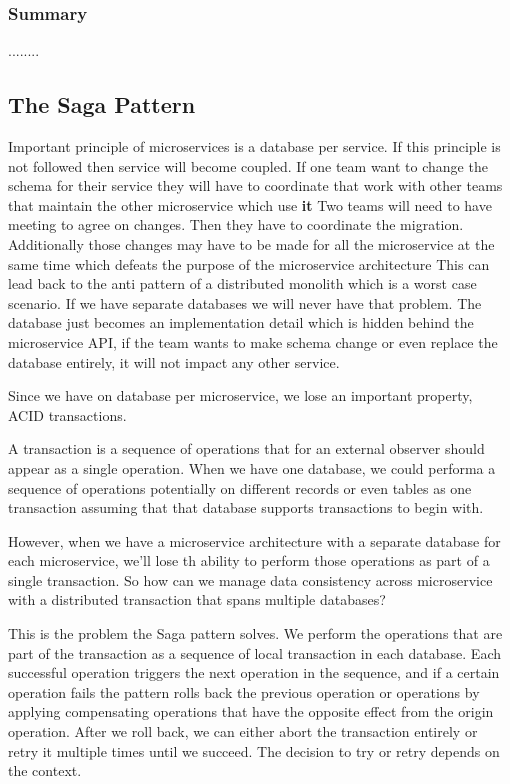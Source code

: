 \subsubsection{Summary}
........

\subsection{The Saga Pattern}
Important principle of microservices is a database per service.
If this principle is not followed then service will become coupled.
If one team want to change the schema for their service they will have to coordinate that work with other teams that maintain the other microservice which use \textbf{it}
Two teams will need to have meeting to agree on changes.
Then they have to coordinate the migration.
Additionally those changes may have to be made for all the microservice at the same time which defeats the purpose of the microservice architecture
This can lead back to the anti pattern of a distributed monolith which is a worst case scenario.
If we have separate databases we will never have that problem.
The database just becomes an implementation detail which is hidden behind the microservice API, if the team wants to make schema change or even replace the database entirely, it will not impact any other service.

Since we have on database per microservice, we lose an important property, ACID transactions.

A transaction is a sequence of operations that for an external observer should appear as a single operation.
When we have one database, we could performa a sequence of operations potentially on different records or even tables as one transaction assuming that that database supports transactions to begin with.

However, when we have a microservice architecture with a separate database for each microservice, we'll lose th ability to perform those operations as part of a single transaction.
So how can we manage data consistency across microservice with a distributed transaction that spans multiple databases?

This is the problem the Saga pattern solves.
We perform the operations that are part of the transaction as a sequence of local transaction in each database.
Each successful operation triggers the next operation in the sequence, and if a certain operation fails the pattern rolls back the previous operation or operations by applying compensating operations that have the opposite effect from the origin operation.
After we roll back, we can either abort the transaction entirely or retry it multiple times until we succeed.
The decision to try or retry depends on the context.

